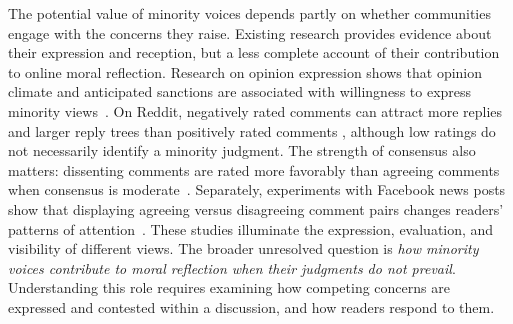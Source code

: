 The potential value of minority voices depends partly on whether
communities engage with the concerns they raise. Existing research
provides evidence about their expression and reception, but a less
complete account of their contribution to online moral reflection.
Research on opinion expression shows that opinion climate and
anticipated sanctions are associated with willingness to express
minority views~\cite{matthes2010spiral,neubaum2018sanctions}.
On Reddit, negatively
rated comments can attract more replies and larger reply trees than
positively rated comments \cite{davis2021emotional}, although low
ratings do not necessarily identify a minority judgment.
The strength of consensus
also matters: dissenting comments are rated more favorably than
agreeing comments when consensus is
moderate~\cite{mellody2025consensus}. Separately, experiments
with Facebook news posts show that displaying agreeing versus
disagreeing comment pairs changes readers' patterns of
attention~\cite{dutceac2022cueing}. 
These studies illuminate the expression, evaluation, and visibility
of different views.
The broader unresolved question is \emph{how minority voices contribute
to moral reflection when their judgments do not prevail}.
Understanding this role requires examining how competing concerns
are expressed and contested within a discussion, and how readers
respond to them.



